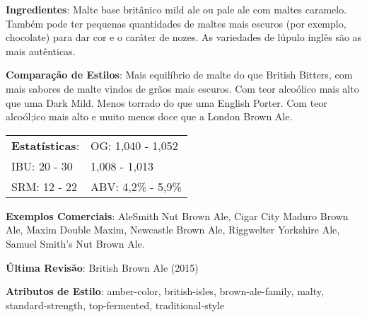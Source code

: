 \textbf{Ingredientes}: Malte base britânico mild ale ou pale ale com maltes caramelo. Também pode ter pequenas quantidades de maltes mais escuros (por exemplo, chocolate) para dar cor e o caráter de nozes. As variedades de lúpulo inglês são as mais autênticas.

\textbf{Comparação de Estilos}: Mais equilíbrio de malte do que British Bitters, com mais sabores de malte vindos de grãos mais escuros. Com teor alcoólico mais alto que uma Dark Mild. Menos torrado do que uma English Porter. Com teor alcoól;ico mais alto e muito menos doce que a London Brown Ale.

\begin{tabular}{@{}p{35mm}p{35mm}@{}}
  \textbf{Estatísticas}: & OG: 1,040 - 1,052 \\
  IBU: 20 - 30  & 1,008 - 1,013  \\
  SRM: 12 - 22  & ABV: 4,2\% - 5,9\%
\end{tabular}

\textbf{Exemplos Comerciais}: AleSmith Nut Brown Ale, Cigar City Maduro Brown Ale, Maxim Double Maxim, Newcastle Brown Ale, Riggwelter Yorkshire Ale, Samuel Smith’s Nut Brown Ale.

\textbf{Última Revisão}: British Brown Ale (2015)

\textbf{Atributos de Estilo}: amber-color, british-isles, brown-ale-family, malty, standard-strength, top-fermented, traditional-style
